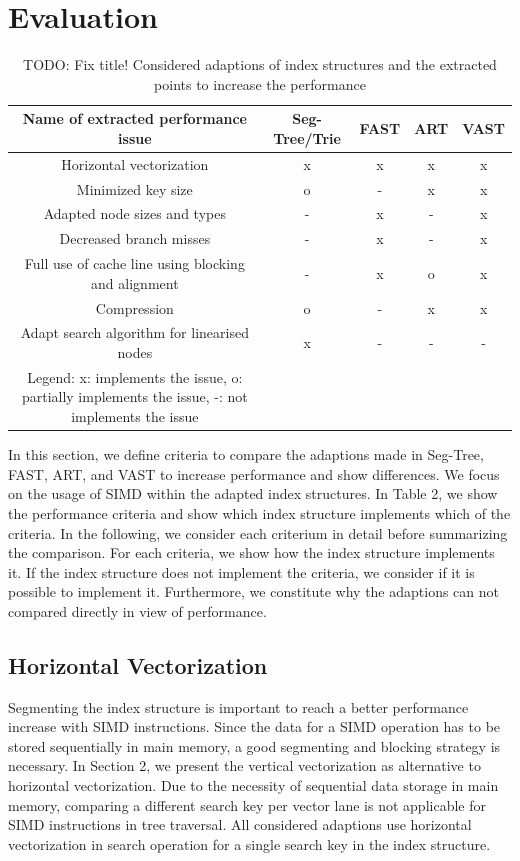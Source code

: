 \documentclass[conference]{IEEEtran}
\begin{document}
\section{Evaluation}
\begin{table}[htbp]
	\caption{TODO: Fix title! Considered adaptions of index structures and the extracted points to increase the performance}
	\begin{center}
		\begin{tabular}{|c|c|c|c|c|}
			\hline
			\textbf{Name of extracted performance issue}&\textbf{Seg-Tree/Trie}&\textbf{FAST}&\textbf{ART}&\textbf{VAST}\\
			\hline
			Horizontal vectorization & x & x & x & x\\
			Minimized key size & o & - & x & x\\
			Adapted node sizes and types & - & x & - & x\\
			Decreased branch misses & - & x & - & x\\
			Full use of cache line using blocking and alignment & - & x & o & x\\
			Compression & o & - & x & x\\
			Adapt search algorithm for linearised nodes & x & - & - & -\\
			\hline
			Legend: x: implements the issue, o: partially implements the issue, -: not implements the issue & & & &\\
			\hline
		\end{tabular}
		\label{tab1}
	\end{center}
\end{table}
In this section, we define criteria to compare the adaptions made in Seg-Tree, FAST, ART, and VAST to increase performance and show differences. We focus on the usage of SIMD within the adapted index structures. %
In Table 2, we show the performance criteria and show which index structure implements which of the criteria. In the following, we consider each criterium in detail before summarizing the comparison. For each criteria, we show how the index structure implements it. If the index structure does not implement the criteria, we consider if it is possible to implement it. Furthermore, we constitute why the adaptions can not compared directly in view of performance.

\subsection{Horizontal Vectorization}
Segmenting the index structure is important to reach a better performance increase with SIMD instructions. Since the data for a SIMD operation has to be stored sequentially in main memory, a good segmenting and blocking strategy is necessary. In Section 2, we present the vertical vectorization as alternative to horizontal vectorization. Due to the necessity of sequential data storage in main memory, comparing a different search key per vector lane is not applicable for SIMD instructions in tree traversal. All considered adaptions use horizontal vectorization in search operation for a single search key in the index structure.
\end{document}
